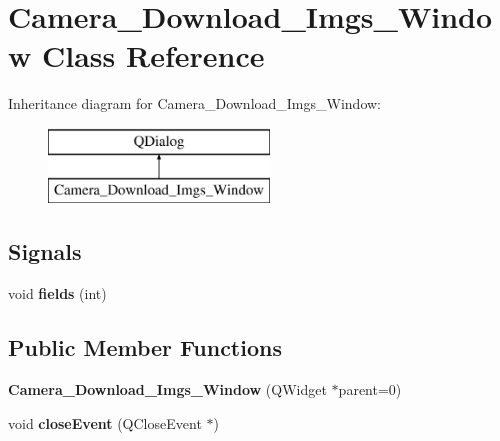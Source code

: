 \hypertarget{class_camera___download___imgs___window}{}\section{Camera\+\_\+\+Download\+\_\+\+Imgs\+\_\+\+Window Class Reference}
\label{class_camera___download___imgs___window}
Inheritance diagram for Camera\+\_\+\+Download\+\_\+\+Imgs\+\_\+\+Window\+:\begin{figure}[H]
\begin{center}
\leavevmode
\includegraphics[height=2.000000cm]{class_camera___download___imgs___window}
\end{center}
\end{figure}
\subsection*{Signals}
\begin{DoxyCompactItemize}
\item 
void {\bfseries fields} (int)\hypertarget{class_camera___download___imgs___window_a388fe05d8eeb66483bf031907da11087}{}\label{class_camera___download___imgs___window_a388fe05d8eeb66483bf031907da11087}

\end{DoxyCompactItemize}
\subsection*{Public Member Functions}
\begin{DoxyCompactItemize}
\item 
{\bfseries Camera\+\_\+\+Download\+\_\+\+Imgs\+\_\+\+Window} (Q\+Widget $\ast$parent=0)\hypertarget{class_camera___download___imgs___window_aa305a3a0e8bf4362fdfae21fa4e0d01e}{}\label{class_camera___download___imgs___window_aa305a3a0e8bf4362fdfae21fa4e0d01e}

\item 
void {\bfseries close\+Event} (Q\+Close\+Event $\ast$)\hypertarget{class_camera___download___imgs___window_a449612cf2bd3304f0550bb319d898b8c}{}\label{class_camera___download___imgs___window_a449612cf2bd3304f0550bb319d898b8c}

\end{DoxyCompactItemize}
